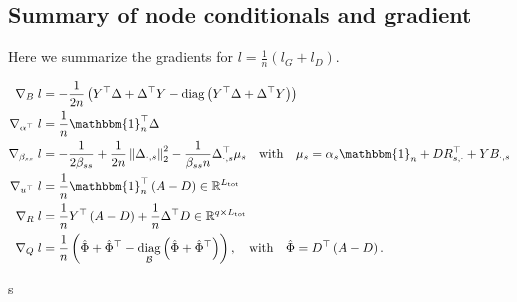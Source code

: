 \documentclass{article}
\def\tot{\text{tot}}
\newcommand{\oneVec}{\mathbbm{1}}
\newcommand{\IR}{{\mathbb{R}}}\newcommand{\IN}{{\mathbb{N}}}
\newcommand{\bPr}[1]{\ensuremath{\left(#1 \right)}} %
\newcommand{\bNorm}[1]{\left\Vert #1\right\Vert} %
\DeclareMathOperator{\diag}{diag}
\begin{document}
\subsection{Summary of node conditionals and gradient}

Here we summarize the gradients for $l= \frac{1}{n} (l_G+l_D)$.

\begin{align*}
\nabla_B\; l &= -\frac{1}{2n}\bPr{Y^\top \Delta + \Delta^\top Y - \diag\bPr{Y^\top \Delta + \Delta^\top Y} } \\
\nabla_{\alpha^\top} \;l &= \frac{1}{n}\oneVec_n^\top \Delta \\
\nabla_{\beta_{ss}} \;l &= -\frac{1}{2\beta_{ss}} + \frac{1}{2n}\bNorm{\Delta_{\cdot, s}}_2^2
- \frac{1}{\beta_{ss}n} \Delta_{\cdot, s}^\top\mu_s \quad\text{with}\quad \mu_s=\alpha_s\oneVec_n + D R_{s, \cdot}^\top + Y B_{\cdot, s} \\
\nabla_{u^\top} \;l &= \frac{1}{n}\oneVec_n^\top \bPr{A - D} \in\IR^{L_{\tot}} \\
\nabla_R \; l &= \frac{1}{n}Y^\top \bPr{A - D} + \frac{1}{n}\Delta^\top D \in \IR^{q \times L_{\tot}} \\
\nabla_Q \; l &= \frac{1}{n} \bPr{\hat{\Phi} + \hat{\Phi}^\top - \diag_\B\bPr{\hat{\Phi} + \hat{\Phi}^\top}},\quad \text{with}\quad\hat{\Phi}  = D^\top \bPr{A - D}.
\end{align*}


s
\end{document}
